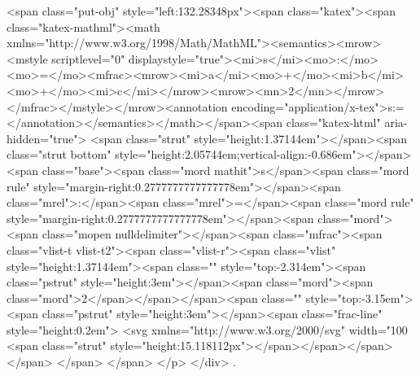 <span class="put-obj" style="left:132.28348px"><span class="katex"><span class="katex-mathml"><math xmlns="http://www.w3.org/1998/Math/MathML"><semantics><mrow><mstyle scriptlevel="0" displaystyle="true"><mi>s</mi><mo>:</mo><mo>=</mo><mfrac><mrow><mi>a</mi><mo>+</mo><mi>b</mi><mo>+</mo><mi>c</mi></mrow><mrow><mn>2</mn></mrow></mfrac></mstyle></mrow><annotation encoding="application/x-tex">\displaystyle s:=</annotation></semantics></math></span><span class="katex-html" aria-hidden="true">
<span class="strut" style="height:1.37144em"></span><span class="strut bottom" style="height:2.05744em;vertical-align:-0.686em"></span><span class="base"><span class="mord mathit">s</span><span class="mord rule" style="margin-right:0.2777777777777778em"></span><span class="mrel">:</span><span class="mrel">=</span><span class="mord rule" style="margin-right:0.2777777777777778em"></span><span class="mord"><span class="mopen nulldelimiter"></span><span class="mfrac"><span class="vlist-t vlist-t2"><span class="vlist-r"><span class="vlist" style="height:1.37144em"><span class="" style="top:-2.314em"><span class="pstrut" style="height:3em"></span><span class="mord"><span class="mord">2</span></span></span><span class="" style="top:-3.15em"><span class="pstrut" style="height:3em"></span><span class="frac-line" style="height:0.2em">
<svg xmlns="http://www.w3.org/2000/svg" width="100%
<span class="strut" style="height:15.118112px"></span></span></span> </span>
</span>​ </span>
</p>
</div>
.